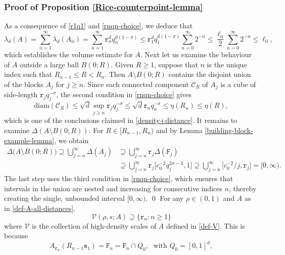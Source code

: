 \documentclass[a4paper,11pt]{amsart}
\numberwithin{equation}{section}
\begin{document}
\subsubsection{Proof of Proposition \ref{Rice-counterpoint-lemma}}
As a consequence of \eqref{r1q1} and \eqref{rnqn-choice}, we deduce that
\begin{equation}  \label{choosing-qnRn-3}
\lambda_d(A) = \sum_{n=1}^{\infty} \lambda_d(A_n) = \sum_{n=1}^{\infty} \mathtt r_n^d q_n^{d(1 - \sigma)} \leq \mathtt r_1^d q_1^{d(1 - \sigma)} \sum_{n=0}^{\infty} 2^{-n} \leq \frac{\ell_0}{2} \sum_{n=0}^{\infty} 2^{-n} \leq \ell_0,   
\end{equation}  
which establishes the volume estimate for $A$. 
\vskip0.1in
\noindent Next let us examine the behaviour of $A$ outside a large ball $B(0;R)$. Given $R \geq 1$, suppose that $n$ is the unique index such that $R_{n-1} \leq R < R_n$. Then $A \setminus B(0;R)$ contains the disjoint union of the blocks $A_j$ for $j \geq n$. 
Since each connected component $\mathscr{C}_R$ of $A_j$ is a cube of side-length $\mathtt r_j q_j^{-\sigma}$, the second condition in \eqref{rnqn-choice} gives 
\[ \text{diam}(\mathscr{C}_R) \leq \sqrt{d} \sup_{j \geq n}\mathtt r_j q_j^{-\sigma} \leq \sqrt{d} \mathtt r_n q_n^{-\sigma} \leq \eta(R_n) \leq \eta(R), \]
which is one of the conclusions claimed in \eqref{density+distance}.
\vskip0.1in     
\noindent It remains to examine $\Delta(A \setminus B(0;R))$. For $R \in [R_{n-1}, R_n)$ and by Lemma \ref{building-block-example-lemma}, we obtain 
\begin{align*} \Delta\bigl(A \setminus B(0;R) \bigr) \supseteq \bigcup_{j=n}^{\infty} \Delta(A_j) &\supseteq \bigcup_{j=n}^{\infty} \mathtt r_j \Delta(\mathtt F_j) \\  &\supseteq \bigcup_{j=n}^{\infty} \mathtt r_j \bigl[c_0^{-2} q_j^{2 \sigma -3}, 1 \bigr] \supseteq \bigcup_{j=n}^{\infty} \bigl[c_0^{-2}/j, \mathtt r_j\bigr] = [0, \infty). \end{align*} 
The last step uses the third condition in \eqref{rnqn-choice}, which ensures that intervals in the union are nested and increasing for consecutive indices $n$, thereby creating the single, unbounded interval $[0, \infty)$.  
\qed
\vskip0.1in
 For any $\rho \in (0,1)$ and $A$ as in \eqref{def-A-all-distances},
\[ \mathscr{V}(\rho, s;A) \supseteq \{\mathtt r_n : n \geq 1\}  \] 
where $\mathscr{V}$ is the collection of high-density scales of $A$ defined in \eqref{def-V}.  This is because 
\[ A_{\mathtt r_n}(R_{n-1}\mathtt e_1) = \mathtt F_n = \mathtt F_n \cap Q_0, \; \text{ with  } Q_0 = [0,1]^d, \] 
\end{document}
